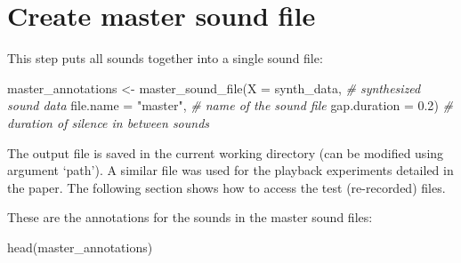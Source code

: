 \documentclass[
  letterpaper,
  DIV=11,
  numbers=noendperiod]{scrartcl}
\newenvironment{Shaded}{\begin{snugshade}}{\end{snugshade}}
\newcommand{\AttributeTok}[1]{\textcolor[rgb]{0.49,0.56,0.16}{#1}}
\newcommand{\CommentTok}[1]{\textcolor[rgb]{0.38,0.63,0.69}{\textit{#1}}}
\newcommand{\FloatTok}[1]{\textcolor[rgb]{0.25,0.63,0.44}{#1}}
\newcommand{\FunctionTok}[1]{\textcolor[rgb]{0.02,0.16,0.49}{#1}}
\newcommand{\NormalTok}[1]{\textcolor[rgb]{0.00,0.44,0.13}{#1}}
\newcommand{\OtherTok}[1]{\textcolor[rgb]{0.00,0.44,0.13}{#1}}
\newcommand{\StringTok}[1]{\textcolor[rgb]{0.25,0.44,0.63}{#1}}
\begin{document}
\hypertarget{create-master-sound-file}{%
\section{Create master sound file}\label{create-master-sound-file}}

This step puts all sounds together into a single sound file:

\begin{Shaded}
\begin{Highlighting}[numbers=left,,]
\NormalTok{master\_annotations }\OtherTok{\textless{}{-}} \FunctionTok{master\_sound\_file}\NormalTok{(}\AttributeTok{X =}\NormalTok{ synth\_data, }\CommentTok{\# synthesized sound data}
                  \AttributeTok{file.name =} \StringTok{"master"}\NormalTok{, }\CommentTok{\# name of the sound file}
                  \AttributeTok{gap.duration =} \FloatTok{0.2}\NormalTok{) }\CommentTok{\# duration of silence in between sounds}
\end{Highlighting}
\end{Shaded}

The output file is saved in the current working directory (can be
modified using argument `path'). A similar file was used for the
playback experiments detailed in the paper. The following section shows
how to access the test (re-recorded) files.

These are the annotations for the sounds in the master sound files:

\begin{Shaded}
\begin{Highlighting}[numbers=left,,]
\FunctionTok{head}\NormalTok{(master\_annotations)}
\end{Highlighting}
\end{Shaded}
\end{document}
